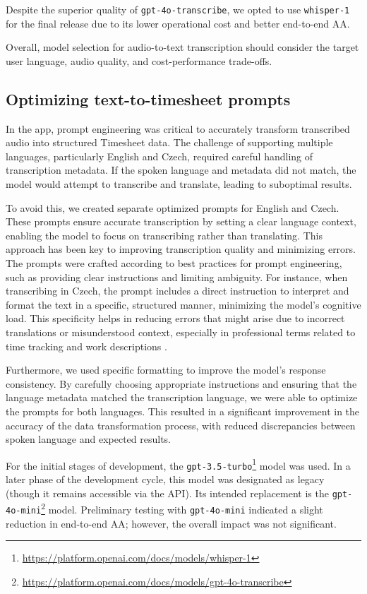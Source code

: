 \documentclass[
  digital,     %
  oneside,     %
  nosansbold,  %
  nocolorbold, %
  lof,         %
  lot,         %
]{fithesis4}
\begin{document}
Despite the superior quality of \texttt{gpt-4o-transcribe}, we opted to use \texttt{whisper-1} for the final release due to its lower operational cost and better end-to-end \gls{AA}.

Overall, model selection for audio-to-text transcription should consider the target user language, audio quality, and cost-performance trade-offs.

\subsection{Optimizing text-to-timesheet prompts}

In the app, prompt engineering was critical to accurately transform transcribed audio into structured Timesheet data. The challenge of supporting multiple languages, particularly English and Czech, required careful handling of transcription metadata. If the spoken language and metadata did not match, the model would attempt to transcribe and translate, leading to suboptimal results.

To avoid this, we created separate optimized prompts for English and Czech. These prompts ensure accurate transcription by setting a clear language context, enabling the model to focus on transcribing rather than translating. This approach has been key to improving transcription quality and minimizing errors. The prompts were crafted according to best practices for prompt engineering, such as providing clear instructions and limiting ambiguity. For instance, when transcribing in Czech, the prompt includes a direct instruction to interpret and format the text in a specific, structured manner, minimizing the model’s cognitive load. This specificity helps in reducing errors that might arise due to incorrect translations or misunderstood context, especially in professional terms related to time tracking and work descriptions \cite{openaiPrompt}.

Furthermore, we used specific formatting to improve the model’s response consistency. By carefully choosing appropriate instructions and ensuring that the language metadata matched the transcription language, we were able to optimize the prompts for both languages. This resulted in a significant improvement in the accuracy of the data transformation process, with reduced discrepancies between spoken language and expected results.

For the initial stages of development, the \texttt{gpt-3.5-turbo}\footnote{\url{https://platform.openai.com/docs/models/whisper-1}} model was used. In a later phase of the development cycle, this model was designated as legacy (though it remains accessible via the \gls{API}). Its intended replacement is the \texttt{gpt-4o-mini}\footnote{\url{https://platform.openai.com/docs/models/gpt-4o-transcribe}} model. Preliminary testing with \texttt{gpt-4o-mini} indicated a slight reduction in end-to-end \gls{AA}; however, the overall impact was not significant.
\end{document}
